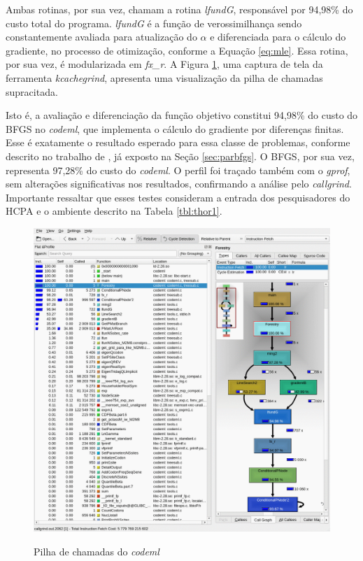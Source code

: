 \documentclass[cic,tc]{iiufrgs}
\begin{document}
Ambas rotinas, por sua vez, chamam a rotina \textit{lfundG}, responsável por
94,98\% do custo total do programa. \textit{lfundG} é a função de
verossimilhança sendo constantemente avaliada para atualização do $\alpha$ e
diferenciada para o cálculo do gradiente, no processo de otimização, conforme a
Equação \ref{eq:mle}. Essa rotina, por sua vez, é modularizada em
\textit{fx\_r}. A Figura \ref{fig:kcachegrind}, uma captura de tela da
ferramenta \textit{kcachegrind}, apresenta uma visualização da pilha de chamadas
supracitada.

Isto é, a avaliação e diferenciação da função objetivo constitui 94,98\% do
custo do BFGS no \textit{codeml}, que implementa o cálculo do gradiente por diferenças
finitas. Esse é exatamente o resultado esperado para essa classe de problemas,
conforme descrito no trabalho de \cite{byrd1988parallel}, já exposto na Seção
\ref{sec:parbfgs}. O BFGS, por sua vez, representa 97,28\% do custo do \textit{codeml}.
O perfil foi traçado também com o \textit{gprof}, sem alterações significativas nos
resultados, confirmando a análise pelo \textit{callgrind}. Importante ressaltar que
esses testes consideram a entrada dos pesquisadores do HCPA e o ambiente
descrito na Tabela \ref{tbl:thor1}.

\begin{figure} \caption{Pilha de chamadas do \textit{codeml}} \begin{center}
\includegraphics[width=0.9\linewidth]{img/kcachegrind.png} \end{center}
 \label{fig:kcachegrind} \end{figure}
\end{document}
